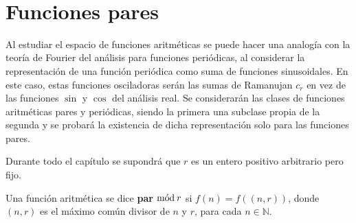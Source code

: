 \newpage
\thispagestyle{empty}
\
\newpage
\section{Funciones pares}

\vspace{-10pt}
\begin{figure}[h]
\centering
\label{fig:even}
\end{figure}

\vspace{30pt}

Al estudiar el espacio de funciones aritméticas se puede hacer una analogía con la teoría de Fourier del análisis para funciones periódicas, al considerar la representación de una función periódica como suma de funciones sinusoidales. En este caso, estas funciones osciladoras serán las sumas de Ramanujan $c_r$ en vez de las funciones $\sin$ y $\cos$ del análisis real. Se considerarán las clases de funciones aritméticas pares y periódicas, siendo la primera una subclase propia de la segunda y se probará la existencia de dicha representación solo para las funciones pares.

\begin{remark}
Durante todo el capítulo se supondrá que $r$ es un entero positivo arbitrario pero fijo.
\end{remark}

\begin{definition}\label{def:even}
Una función aritmética se dice \textbf{par} $\mathrm{m\acute{o}d\:}r$ si $f(n)=f((n,r))$, donde $(n,r)$ es el máximo común divisor de $n$ y $r$, para cada $n \in \mathbb{N}$.
\end{definition}

